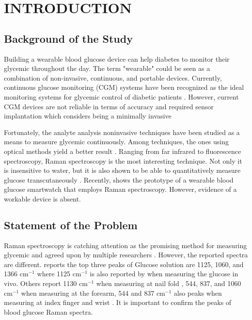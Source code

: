 \chapter{INTRODUCTION} 

\section{Background of the Study}

Building a wearable blood glucose device can help diabetes to monitor their glycemic throughout the day. 
The term "wearable" could be seen as a combination of non-invasive, continuous, and portable devices. 
Currently, continuous glucose monitoring (CGM) systems have been recognized as the ideal monitoring systems for glycemic control of diabetic patients \citep{continuous2021}.
However, current CGM devices are not reliable in terms of accuracy and required sensor implantation which considers being a minimally invasive \citep{CGMminimalinvasive}

Fortunately, the analyte analysis noninvasive techniques have been studied as a means to measure glycemic continuously. 
Among techniques, the ones using optical methods yield a better result \citep{opticalBest}.
Ranging from far infrared to fluorescence spectroscopy, Raman spectroscopy is the most interesting technique. 
Not only it is insensitive to water, but it is also shown to be able to quantitatively measure glucose transcutaneously \citep{directGlucose}.
Recently, \cite{ramanGlucoseWatch} shows the prototype of a wearable blood glucose smartwatch that employs Raman spectroscopy. 
However, evidence of a workable device is absent. 

\section{Statement of the Problem}

\begin{sloppypar}
Raman spectroscopy is catching attention as the promising method for measuring glycemic \citep{directGlucose} and agreed upon by multiple researchers \citep{forearm2005, ramanNailFold2019, directGlucose, sitecompare}.
However, the reported spectra are different.
\cite{solutionGlucose} reports the top three peaks of Glucose solution are 1125, 1060, and 1366 $\text{cm}^{-1}$ where 1125 $\text{cm}^{-1}$ is also reported by \cite{directGlucose,solutionGlucose} when measuring the glucose in vivo.
Others report 1130 $\text{cm}^{-1}$ when measuring at nail fold \citep{ramanNailFold2019},  544, 837, and 1060 $\text{cm}^{-1}$ when measuring at the forearm, 544 and 837 $\text{cm}^{-1}$ also peaks when measuring at index finger and wrist \citep{sitecompare}.
It is important to confirm the peaks of blood glucose Raman spectra.
\end{sloppypar}

